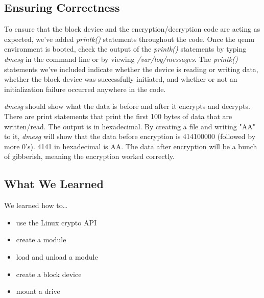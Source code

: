 \documentclass[draftclsnofoot, onecolumn, 10pt, compsoc]{IEEEtran}
\begin{document}
		\subsection{Ensuring Correctness}
			To ensure that the block device and the encryption/decryption code are acting as expected, we've added \textit{printk()} statements throughout the code. Once the qemu environment is booted, check the output of the \textit{printk()} statements by typing \textit{dmesg} in the command line or by viewing \textit{/var/log/messages}. The \textit{printk()} statements we've included indicate whether the device is reading or writing data, whether the block device was successfully initiated, and whether or not an initialization failure occurred anywhere in the code.
			
			\textit{dmesg} should show what the data is before and after it encrypts and decrypts.
			There are print statements that print the first 100 bytes of data that are written/read. 
			The output is in hexadecimal.
			By creating a file and writing "AA" to it, \textit{dmesg} will show that the data before encryption is 414100000 (followed by more 0's). 
			4141 in hexadecimal is AA.
			The data after encryption will be a bunch of gibberish, meaning the encryption worked correctly.
		\subsection{What We Learned}
			We learned how to\dots 
			\begin{itemize}
				\item use the Linux crypto API
				
				\item create a module
				
				\item load and unload a module
				
				\item create a block device
				
				\item mount a drive
			\end{itemize}
\end{document}
